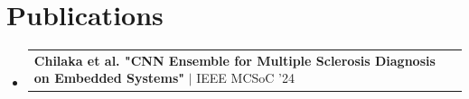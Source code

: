 \documentclass[letterpaper,11pt]{article}
\makeatletter
\newcommand{\resumeProjectHeading}[2]{
    \vspace{1pt}\item
    \begin{tabular*}{0.97\textwidth}{l@{\extracolsep{\fill}}r}
      \small#1 & #2 \\
    \end{tabular*}\vspace{-5pt}
}
\newcommand{\resumeSubHeadingListStart}{\begin{itemize}[leftmargin=0.15in, label={}]}
\newcommand{\resumeSubHeadingListEnd}{\end{itemize}}
\makeatother
\begin{document}
\section{Publications}
  \resumeSubHeadingListStart
  \vspace{-8px}
  \resumeProjectHeading
        {\textbf{Chilaka et al. "CNN Ensemble for Multiple Sclerosis Diagnosis on Embedded Systems"} $|$ IEEE MCSoC '24}{}
        \resumeSubHeadingListEnd

\end{document}
